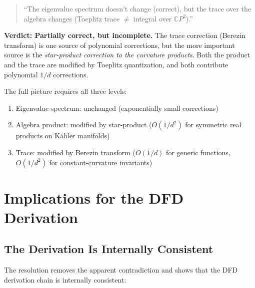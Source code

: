 \documentclass[12pt,a4paper]{article}
\theoremstyle{definition}
\begin{document}
\begin{quote}
``The eigenvalue spectrum doesn't change (correct), but the trace
over the algebra changes (Toeplitz trace $\neq$ integral over
$\mathbb{C}P^2$).''
\end{quote}

\textbf{Verdict: Partially correct, but incomplete.}  The trace
correction (Berezin transform) is one source of polynomial corrections,
but the more important source is the \emph{star-product correction to
the curvature products}.  Both the product and the trace are modified
by Toeplitz quantization, and both contribute polynomial $1/d$ corrections.

The full picture requires all three levels:
\begin{enumerate}
\item Eigenvalue spectrum: unchanged (exponentially small corrections)
\item Algebra product: modified by star-product ($O(1/d^2)$ for
  symmetric real products on K\"ahler manifolds)
\item Trace: modified by Berezin transform ($O(1/d)$ for generic
  functions, $O(1/d^2)$ for constant-curvature invariants)
\end{enumerate}

\section{Implications for the DFD Derivation}
\label{sec:implications}

\subsection{The Derivation Is Internally Consistent}

The resolution removes the apparent contradiction and shows that the
DFD derivation chain is internally consistent:
\end{document}
